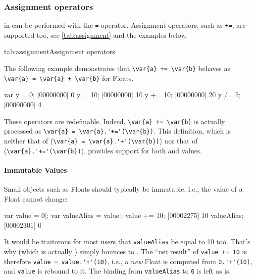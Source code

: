 \subsubsection{Assignment operators}
\label{sec:lang:op:ass}


 in \us can be performed with the \lstinline|=| operator.
Assignment operators, such as \lstinline|+=|, are supported too, see
\autoref{tab:assignment} and the examples below.


\begin{operatorTable}{tab:assignment}{Assignment operators}
  \operatorass[\footnotemark]\\
  \operatorsiass
\end{operatorTable}


The following example demonstrates that \lstinline|\var{a} += \var{b}|
behaves as \lstinline|\var{a} = \var{a} + \var{b}| for Floats.
\begin{urbiscript}
var y = 0;
[00000000] 0
y = 10;
[00000000] 10
y += 10;
[00000000] 20
y /= 5;
[00000000] 4
\end{urbiscript}

These operators are redefinable.  Indeed, \lstinline|\var{a} += \var{b}| is
actually processed as \lstinline|\var{a} = \var{a}.'+='(\var{b})|.  This
definition, which is neither that of \langC
(\lstinline|\var{a} = \var{a}.'+'(\var{b})|) nor that of \Cxx
(\lstinline|\var{a}.'+='(\var{b})|), provides support for both
 and  values.

\paragraph{Immutable Values}
Small objects such as Floats should typically be immutable, i.e., the value
of a Float cannot change:

\begin{urbiscript}
var value = 0|;
var valueAlias = value|;
value += 10;
[00002275] 10
valueAlias;
[00002301] 0
\end{urbiscript}

It would be traitorous for most users that \lstinline|valueAlias| be equal
to 10 too.  That's why  (which is actually
) simply bounces to .  The ``net
result'' of \lstinline|value += 10| is therefore
\lstinline|value = value.'+'(10)|, i.e., a \emph{new} Float is computed from
\lstinline|0.'+'(10)|, and \lstinline|value| is rebound to it.  The binding
from \lstinline|valueAlias| to \lstinline|0| is left as is.

